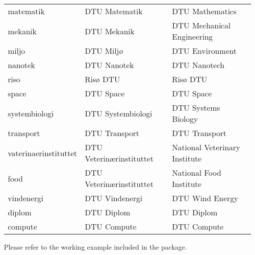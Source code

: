 \documentclass{article}
\begin{document}
\begin{enumerate}
\begin{table}[H]
\begin{tabular}{lll}
                        matematik&DTU Matematik&DTU Mathematics\\
                        mekanik&DTU Mekanik&DTU Mechanical Engineering\\
                        miljo&DTU Milj\o&DTU Environment\\
                        nanotek&DTU Nanotek&DTU Nanotech\\
                        riso & Risø DTU & Risø DTU\\
                        space&DTU Space&DTU Space\\
                        systembiologi&DTU Systembiologi&DTU Systems Biology\\
                        transport&DTU Transport&DTU Transport\\
                        vaterinaerinstituttet&DTU Veterin\ae rinstituttet&National Veterinary Institute\\
                        food&DTU Veterin\ae rinstituttet&National Food Institute\\
                        vindenergi & DTU Vindenergi & DTU Wind Energy\\
                        diplom & DTU Diplom & DTU Diplom\\
                        compute & DTU Compute & DTU Compute
                \end{tabular}
                \label{tab:deps}
                \end{table}
        \end{enumerate}
        
        Please refer to the working example included in the package.
\end{document}
